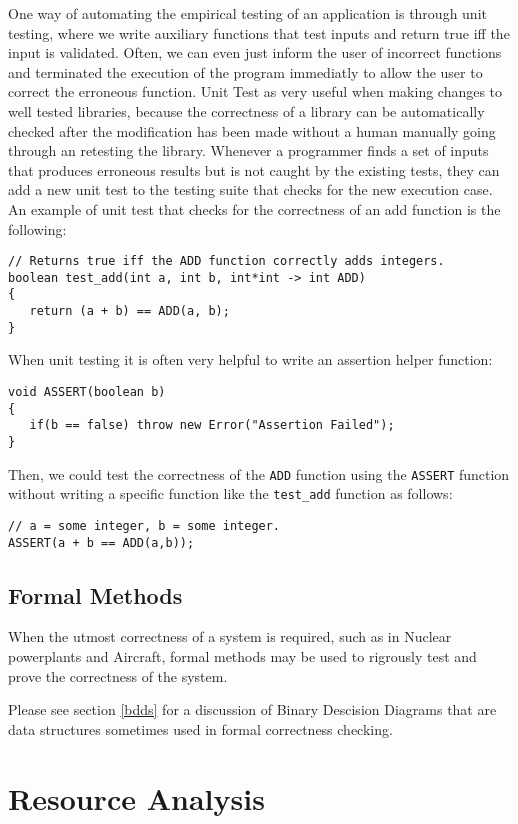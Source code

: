 \documentclass[12pt, letterpaper]{book}
\begin{document}
	One way of automating the empirical testing of an application is through unit testing, where we write auxiliary functions that test inputs and return true iff the input is validated. Often, we can even just inform the user of incorrect functions and terminated the execution of the program immediatly to allow the user to correct the erroneous function. Unit Test as very useful when making changes to well tested libraries, because the correctness of a library can be automatically checked after the modification has been made without a human manually going through an retesting the library. Whenever a programmer finds a set of inputs that produces erroneous results but is not caught by the existing tests, they can add a new unit test to the testing suite that checks for the new execution case.
	An example of unit test that checks for the correctness of an add function is the following:
\begin{verbatim}
// Returns true iff the ADD function correctly adds integers.
boolean test_add(int a, int b, int*int -> int ADD)
{
   return (a + b) == ADD(a, b); 
}
\end{verbatim}

When unit testing it is often very helpful to write an assertion helper function:
\begin{verbatim}
void ASSERT(boolean b)
{
   if(b == false) throw new Error("Assertion Failed");
}
\end{verbatim}

Then, we could test the correctness of the \texttt{ADD} function using the \texttt{ASSERT} function without writing a specific function like the \texttt{test\_add} function as follows:
\begin{verbatim}
// a = some integer, b = some integer.
ASSERT(a + b == ADD(a,b));
\end{verbatim}

	\subsection{Formal Methods}
	When the utmost correctness of a system is required, such as in Nuclear powerplants and Aircraft, formal methods may be used to rigrously test and prove the correctness of the system.

		Please see section \ref{bdds} for a discussion of Binary Descision Diagrams that are data structures sometimes used in formal correctness checking.

	\section{Resource Analysis}
\end{document}
